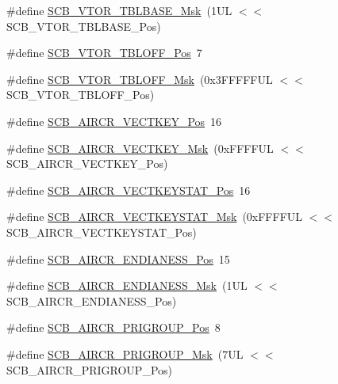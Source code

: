 \begin{DoxyCompactItemize}
\#define \mbox{\hyperlink{group___c_m_s_i_s___s_c_b_ga778dd0ba178466b2a8877a6b8aa345ee}{S\+C\+B\+\_\+\+V\+T\+O\+R\+\_\+\+T\+B\+L\+B\+A\+S\+E\+\_\+\+Msk}}~(1\+U\+L $<$$<$ S\+C\+B\+\_\+\+V\+T\+O\+R\+\_\+\+T\+B\+L\+B\+A\+S\+E\+\_\+\+Pos)
\item 
\#define \mbox{\hyperlink{group___c_m_s_i_s___s_c_b_gac6a55451ddd38bffcff5a211d29cea78}{S\+C\+B\+\_\+\+V\+T\+O\+R\+\_\+\+T\+B\+L\+O\+F\+F\+\_\+\+Pos}}~7
\item 
\#define \mbox{\hyperlink{group___c_m_s_i_s___s_c_b_ga75e395ed74042923e8c93edf50f0996c}{S\+C\+B\+\_\+\+V\+T\+O\+R\+\_\+\+T\+B\+L\+O\+F\+F\+\_\+\+Msk}}~(0x3\+F\+F\+F\+F\+F\+U\+L $<$$<$ S\+C\+B\+\_\+\+V\+T\+O\+R\+\_\+\+T\+B\+L\+O\+F\+F\+\_\+\+Pos)
\item 
\#define \mbox{\hyperlink{group___c_m_s_i_s___s_c_b_gaaa27c0ba600bf82c3da08c748845b640}{S\+C\+B\+\_\+\+A\+I\+R\+C\+R\+\_\+\+V\+E\+C\+T\+K\+E\+Y\+\_\+\+Pos}}~16
\item 
\#define \mbox{\hyperlink{group___c_m_s_i_s___s_c_b_ga90c7cf0c490e7ae55f9503a7fda1dd22}{S\+C\+B\+\_\+\+A\+I\+R\+C\+R\+\_\+\+V\+E\+C\+T\+K\+E\+Y\+\_\+\+Msk}}~(0x\+F\+F\+F\+F\+U\+L $<$$<$ S\+C\+B\+\_\+\+A\+I\+R\+C\+R\+\_\+\+V\+E\+C\+T\+K\+E\+Y\+\_\+\+Pos)
\item 
\#define \mbox{\hyperlink{group___c_m_s_i_s___s_c_b_gaec404750ff5ca07f499a3c06b62051ef}{S\+C\+B\+\_\+\+A\+I\+R\+C\+R\+\_\+\+V\+E\+C\+T\+K\+E\+Y\+S\+T\+A\+T\+\_\+\+Pos}}~16
\item 
\#define \mbox{\hyperlink{group___c_m_s_i_s___s_c_b_gabacedaefeefc73d666bbe59ece904493}{S\+C\+B\+\_\+\+A\+I\+R\+C\+R\+\_\+\+V\+E\+C\+T\+K\+E\+Y\+S\+T\+A\+T\+\_\+\+Msk}}~(0x\+F\+F\+F\+F\+U\+L $<$$<$ S\+C\+B\+\_\+\+A\+I\+R\+C\+R\+\_\+\+V\+E\+C\+T\+K\+E\+Y\+S\+T\+A\+T\+\_\+\+Pos)
\item 
\#define \mbox{\hyperlink{group___c_m_s_i_s___s_c_b_gad31dec98fbc0d33ace63cb1f1a927923}{S\+C\+B\+\_\+\+A\+I\+R\+C\+R\+\_\+\+E\+N\+D\+I\+A\+N\+E\+S\+S\+\_\+\+Pos}}~15
\item 
\#define \mbox{\hyperlink{group___c_m_s_i_s___s_c_b_ga2f571f93d3d4a6eac9a3040756d3d951}{S\+C\+B\+\_\+\+A\+I\+R\+C\+R\+\_\+\+E\+N\+D\+I\+A\+N\+E\+S\+S\+\_\+\+Msk}}~(1\+U\+L $<$$<$ S\+C\+B\+\_\+\+A\+I\+R\+C\+R\+\_\+\+E\+N\+D\+I\+A\+N\+E\+S\+S\+\_\+\+Pos)
\item 
\#define \mbox{\hyperlink{group___c_m_s_i_s___s_c_b_gaca155deccdeca0f2c76b8100d24196c8}{S\+C\+B\+\_\+\+A\+I\+R\+C\+R\+\_\+\+P\+R\+I\+G\+R\+O\+U\+P\+\_\+\+Pos}}~8
\item 
\#define \mbox{\hyperlink{group___c_m_s_i_s___s_c_b_ga8be60fff03f48d0d345868060dc6dae7}{S\+C\+B\+\_\+\+A\+I\+R\+C\+R\+\_\+\+P\+R\+I\+G\+R\+O\+U\+P\+\_\+\+Msk}}~(7\+U\+L $<$$<$ S\+C\+B\+\_\+\+A\+I\+R\+C\+R\+\_\+\+P\+R\+I\+G\+R\+O\+U\+P\+\_\+\+Pos)

\end{DoxyCompactItemize}
